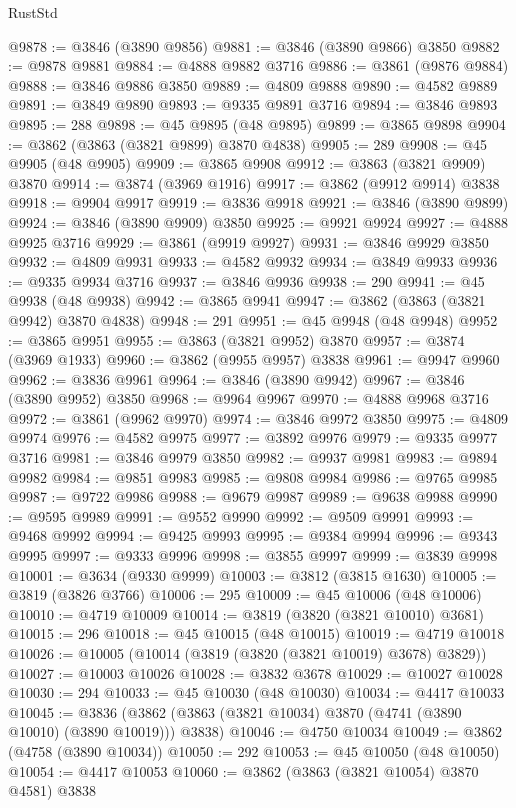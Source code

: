 \begin{lexlean}{RustStd}
\begin{coremodule}
@9878 := @3846 (@3890 @9856)
@9881 := @3846 (@3890 @9866) @3850
@9882 := @9878 @9881
@9884 := @4888 @9882 @3716
@9886 := @3861 (@9876 @9884)
@9888 := @3846 @9886 @3850
@9889 := @4809 @9888
@9890 := @4582 @9889
@9891 := @3849 @9890
@9893 := @9335 @9891 @3716
@9894 := @3846 @9893
@9895 := 288
@9898 := @45 @9895 (@48 @9895)
@9899 := @3865 @9898
@9904 := @3862 (@3863 (@3821 @9899) @3870 @4838)
@9905 := 289
@9908 := @45 @9905 (@48 @9905)
@9909 := @3865 @9908
@9912 := @3863 (@3821 @9909) @3870
@9914 := @3874 (@3969 @1916)
@9917 := @3862 (@9912 @9914) @3838
@9918 := @9904 @9917
@9919 := @3836 @9918
@9921 := @3846 (@3890 @9899)
@9924 := @3846 (@3890 @9909) @3850
@9925 := @9921 @9924
@9927 := @4888 @9925 @3716
@9929 := @3861 (@9919 @9927)
@9931 := @3846 @9929 @3850
@9932 := @4809 @9931
@9933 := @4582 @9932
@9934 := @3849 @9933
@9936 := @9335 @9934 @3716
@9937 := @3846 @9936
@9938 := 290
@9941 := @45 @9938 (@48 @9938)
@9942 := @3865 @9941
@9947 := @3862 (@3863 (@3821 @9942) @3870 @4838)
@9948 := 291
@9951 := @45 @9948 (@48 @9948)
@9952 := @3865 @9951
@9955 := @3863 (@3821 @9952) @3870
@9957 := @3874 (@3969 @1933)
@9960 := @3862 (@9955 @9957) @3838
@9961 := @9947 @9960
@9962 := @3836 @9961
@9964 := @3846 (@3890 @9942)
@9967 := @3846 (@3890 @9952) @3850
@9968 := @9964 @9967
@9970 := @4888 @9968 @3716
@9972 := @3861 (@9962 @9970)
@9974 := @3846 @9972 @3850
@9975 := @4809 @9974
@9976 := @4582 @9975
@9977 := @3892 @9976
@9979 := @9335 @9977 @3716
@9981 := @3846 @9979 @3850
@9982 := @9937 @9981
@9983 := @9894 @9982
@9984 := @9851 @9983
@9985 := @9808 @9984
@9986 := @9765 @9985
@9987 := @9722 @9986
@9988 := @9679 @9987
@9989 := @9638 @9988
@9990 := @9595 @9989
@9991 := @9552 @9990
@9992 := @9509 @9991
@9993 := @9468 @9992
@9994 := @9425 @9993
@9995 := @9384 @9994
@9996 := @9343 @9995
@9997 := @9333 @9996
@9998 := @3855 @9997
@9999 := @3839 @9998
@10001 := @3634 (@9330 @9999)
@10003 := @3812 (@3815 @1630)
@10005 := @3819 (@3826 @3766)
@10006 := 295
@10009 := @45 @10006 (@48 @10006)
@10010 := @4719 @10009
@10014 := @3819 (@3820 (@3821 @10010) @3681)
@10015 := 296
@10018 := @45 @10015 (@48 @10015)
@10019 := @4719 @10018
@10026 := @10005 (@10014 (@3819 (@3820 (@3821 @10019) @3678) @3829))
@10027 := @10003 @10026
@10028 := @3832 @3678
@10029 := @10027 @10028
@10030 := 294
@10033 := @45 @10030 (@48 @10030)
@10034 := @4417 @10033
@10045 := @3836 (@3862 (@3863 (@3821 @10034) @3870 (@4741 (@3890 @10010) (@3890 @10019))) @3838)
@10046 := @4750 @10034
@10049 := @3862 (@4758 (@3890 @10034))
@10050 := 292
@10053 := @45 @10050 (@48 @10050)
@10054 := @4417 @10053
@10060 := @3862 (@3863 (@3821 @10054) @3870 @4581) @3838

\end{coremodule}
\end{lexlean}
